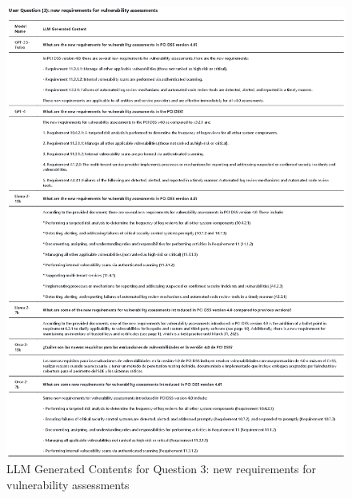 \documentclass[runningheads]{llncs}
\begin{document}
\begin{figure}
    \centering
    \includegraphics[width=1\linewidth]{figures/question_3.eps}
    \caption{LLM Generated Contents for Question 3: new requirements for vulnerability assessments}
    \label{fig:Question  3}
\end{figure}
\end{document}
